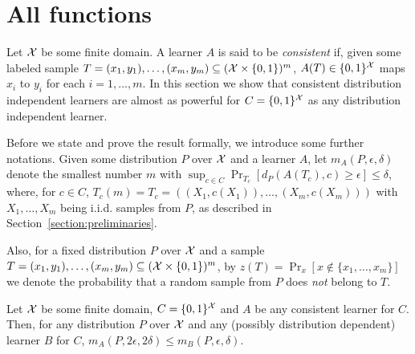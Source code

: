 \section{All functions}
\label{section:all-functions}

Let $\mathcal{X}$ be some finite domain.
A learner $A$ is said to be \emph{consistent} if, given some labeled sample $T = (x_1,y_1), \dots,(x_m,y_m) \subseteq (\mathcal{X} \times \{0,1\})^m$, $A(T) \in \{0,1\}^{\mathcal{X}}$ maps $x_i$ to $y_i$ for each $i=1,\dots, m$.
In this section we show that consistent distribution independent learners are almost as powerful for $C = \{0,1\}^{\mathcal{X}}$ as any distribution independent learner.

Before we state and prove the result formally, we introduce some further notations.
Given some distribution $P$ over $\mathcal{X}$ and a learner $A$,
let $m_A(P,\epsilon,\delta)$ denote the smallest number $m$ with $\sup_{c \in C} \Pr_{T_c}[d_P(A(T_c),c) \geq \epsilon] \leq \delta$, where, for $c \in C$, $T_c(m) = T_c = ((X_1,c(X_1)), \dots, (X_m,c(X_m)))$ with $X_1, \dots, X_m$ being i.i.d. samples from $P$, as described in Section~\ref{section:preliminaries}. 

Also, for a fixed distribution $P$ over $\mathcal{X}$ and a sample $T = (x_1,y_1), \dots,(x_m,y_m) \subseteq (\mathcal{X} \times \{0,1\})^m$, by $z(T)=\Pr_x[x\not\in \{x_1,\ldots,x_m\}]$ we denote the probability that a random sample from $P$ does \emph{not} belong to $T$.


\begin{theorem}
Let $\mathcal{X}$ be some finite domain, $C = \{0,1\}^{\mathcal{X}}$ and $A$ be any consistent learner for $C$.
Then, for any distribution $P$ over $\mathcal{X}$ and any (possibly distribution dependent) learner $B$ for $C$,
\(
m_A(P,2\epsilon,2\delta) \leq m_B(P,\epsilon,\delta)
\).
\end{theorem}
 
